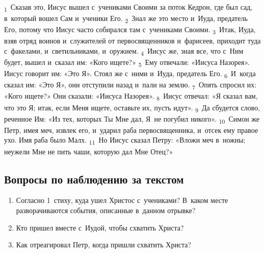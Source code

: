 \documentclass[a4paper,12pt]{article}
\begin{document}
\textsubscript{1}~Сказав это, Иисус вышел с~учениками Своими за поток Кедрон, где был сад, в~который вошел Сам и~ученики Его. \textsubscript{2}~Знал же это место и~Иуда, предатель Его, потому что Иисус часто собирался там с~учениками Своими. \textsubscript{3}~Итак, Иуда, взяв отряд воинов и~служителей от первосвященников и~фарисеев, приходит туда с~факелами, и~светильниками, и~оружием. \textsubscript{4}~Иисус же, зная все, что с~Ним будет, вышел и~сказал им: «Кого ищете?» \textsubscript{5}~Ему отвечали: «Иисуса Назорея». Иисус говорит им: «Это Я». Стоял же с~ними и~Иуда, предатель Его. \textsubscript{6}~И~когда сказал им: «Это Я», они отступили назад и~пали на землю. \textsubscript{7}~Опять спросил их: «Кого ищете?» Они сказали: «Иисуса Назорея». \textsubscript{8}~Иисус отвечал: «Я сказал вам, что это Я; итак, если Меня ищете, оставьте их, пусть идут». \textsubscript{9}~Да сбудется слово, реченное Им: «Из тех, которых Ты Мне дал, Я~не погубил никого». \textsubscript{10}~Симон же Петр, имея меч, извлек его, и~ударил раба первосвященника, и~отсек ему правое ухо. Имя раба было Малх. \textsubscript{11}~Но Иисус сказал Петру: «Вложи меч в~ножны; неужели Мне не пить чаши, которую дал Мне Отец?» 

\subsection*{Вопросы по наблюдению за текстом}
\begin{enumerate}
    \item Согласно 1~стиху, куда ушел Христос с~учениками? В~каком месте разворачиваются события, описанные в~данном отрывке? 
    
    \myline
    
    \myline
    \item Кто пришел вместе с~Иудой, чтобы схватить Христа? 
    
    \myline
    
    \myline
    \item Как отреагировал Петр, когда пришли схватить Христа? 
    
    \myline
    
    \myline
\end{enumerate}
\end{document}
